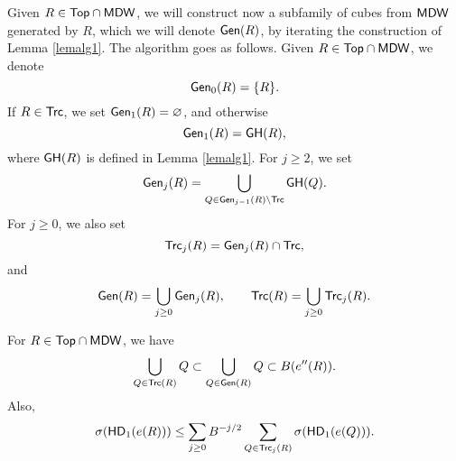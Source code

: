 Given $R\in{\mathsf {Top}}\cap {\mathsf{MDW}}$, we will construct now a subfamily of cubes from ${\mathsf{MDW}}$ generated by $R$,
which we will denote ${\mathsf {Gen}}(R)$, by iterating the construction of Lemma \ref{lemalg1}.
The algorithm goes as follows.
Given $R\in{\mathsf {Top}}\cap {\mathsf{MDW}}$, we denote 
$${\mathsf {Gen}}_0(R) = \{R\}.$$
If $R\in{\mathsf{Trc}}$, we set ${\mathsf {Gen}}_1(R)=\varnothing$, and otherwise
$${\mathsf {Gen}}_1(R) = {\mathsf{GH}}(R),$$
where ${\mathsf{GH}}(R)$ is defined in Lemma \ref{lemalg1}.
For $j\geq 2$, we set
$${\mathsf {Gen}}_{j}(R) = \bigcup_{Q\in{\mathsf {Gen}}_{j-1}(R)\setminus {\mathsf{Trc}}} {\mathsf{GH}}(Q).$$
For $j\geq0$, we also set
$${\mathsf{Trc}}_j(R) = {\mathsf {Gen}}_j(R)\cap{\mathsf{Trc}},$$
and
$${\mathsf {Gen}}(R) = \bigcup_{j\geq0}{\mathsf {Gen}}_j(R),\qquad{\mathsf{Trc}}(R) = \bigcup_{j\geq0}{\mathsf{Trc}}_j(R).$$
\vv


\begin{lemma}\label{eqtec74}
For $R\in{\mathsf {Top}}\cap {\mathsf{MDW}}$, we have
\begin{equation}\label{eqtec741}
\bigcup_{Q\in{\mathsf{Trc}}(R)}Q\subset\bigcup_{Q\in{\mathsf {Gen}}(R)}Q \subset B(e''(R)).
\end{equation}
Also,
\begin{equation}\label{eqiter*44}
\sigma({\mathsf{HD}}_1(e(R)))\leq \sum_{j\geq0} B^{-j/2}\sum_{Q\in{\mathsf{Trc}}_j(R)}\sigma({\mathsf{HD}}_1(e(Q))).
\end{equation}
\end{lemma}



